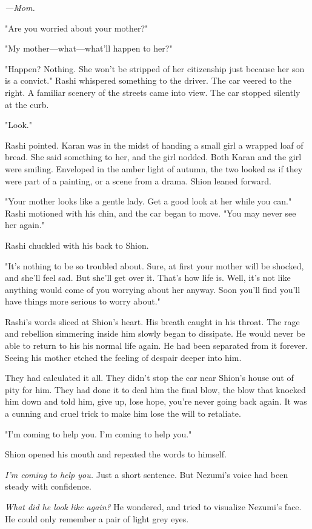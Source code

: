 \emph{---Mom.}

"Are you worried about your mother?"

"My mother---what---what'll happen to her?"

"Happen? Nothing. She won't be stripped of her citizenship just because
her son is a convict." Rashi whispered something to the driver. The car
veered to the right. A familiar scenery of the streets came into view.
The car stopped silently at the curb.

"Look."

Rashi pointed. Karan was in the midst of handing a small girl a wrapped
loaf of bread. She said something to her, and the girl nodded. Both
Karan and the girl were smiling. Enveloped in the amber light of autumn,
the two looked as if they were part of a painting, or a scene from a
drama. Shion leaned forward.

"Your mother looks like a gentle lady. Get a good look at her while you
can." Rashi motioned with his chin, and the car began to move. "You may
never see her again."

Rashi chuckled with his back to Shion.

"It's nothing to be so troubled about. Sure, at first your mother will
be shocked, and she'll feel sad. But she'll get over it. That's how life
is. Well, it's not like anything would come of you worrying about her
anyway. Soon you'll find you'll have things more serious to worry
about."

Rashi's words sliced at Shion's heart. His breath caught in his throat.
The rage and rebellion simmering inside him slowly began to dissipate.
He would never be able to return to his his normal life again. He had
been separated from it forever. Seeing his mother etched the feeling of
despair deeper into him.

They had calculated it all. They didn't stop the car near Shion's house
out of pity for him. They had done it to deal him the final blow, the
blow that knocked him down and told him, give up, lose hope, you're
never going back again. It was a cunning and cruel trick to make him
lose the will to retaliate.

"I'm coming to help you. I'm coming to help you."

Shion opened his mouth and repeated the words to himself.

\emph{I'm coming to help you.} Just a short sentence. But Nezumi's voice had
been steady with confidence.

\emph{What did he look like again?} He wondered, and tried to visualize
Nezumi's face. He could only remember a pair of light grey eyes.

